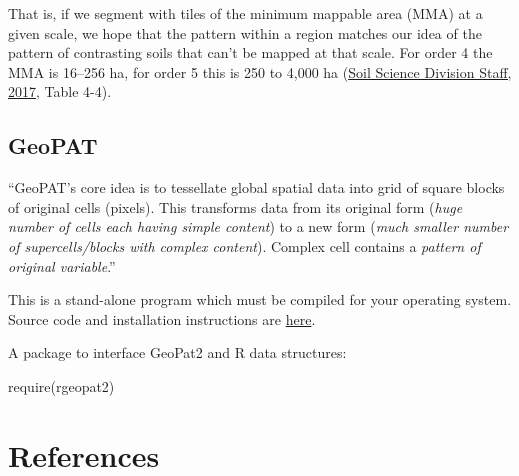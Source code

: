 \documentclass[
  letterpaper,
  DIV=11,
  numbers=noendperiod]{scrartcl}
\newenvironment{Shaded}{\begin{snugshade}}{\end{snugshade}}
\newcommand{\FunctionTok}[1]{\textcolor[rgb]{0.28,0.35,0.67}{#1}}
\newcommand{\NormalTok}[1]{\textcolor[rgb]{0.00,0.23,0.31}{#1}}
\begin{document}
That is, if we segment with tiles of the minimum mappable area (MMA) at
a given scale, we hope that the pattern within a region matches our idea
of the pattern of contrasting soils that can't be mapped at that scale.
For order 4 the MMA is 16--256 ha, for order 5 this is 250 to 4,000 ha
(\protect\hyperlink{ref-soil_survey_division_staff_soil_2017}{Soil
Science Division Staff, 2017}, Table 4-4).

\hypertarget{geopat}{%
\subsection{GeoPAT}\label{geopat}}

``GeoPAT's core idea is to tessellate global spatial data into grid of
square blocks of original cells (pixels). This transforms data from its
original form (\emph{huge number of cells each having simple content})
to a new form (\emph{much smaller number of supercells/blocks with
complex content}). Complex cell contains a \emph{pattern of original
variable}.''

This is a stand-alone program which must be compiled for your operating
system. Source code and installation instructions are
\href{https://github.com/Nowosad/geopat2}{here}.

A package to interface GeoPat2 and R data structures:

\begin{Shaded}
\begin{Highlighting}[]
\FunctionTok{require}\NormalTok{(rgeopat2)}
\end{Highlighting}
\end{Shaded}

\hypertarget{references}{%
\section{References}\label{references}}
\end{document}
